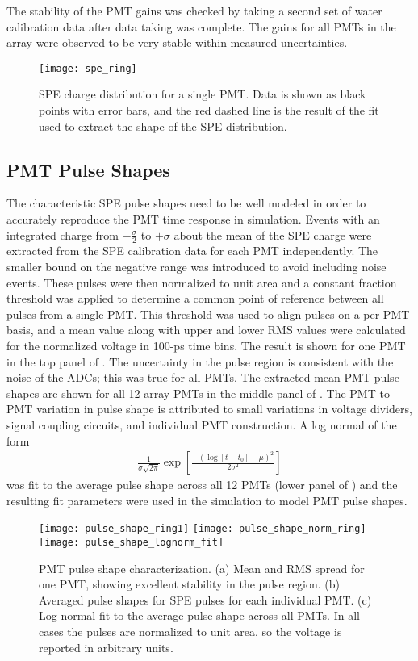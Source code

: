 The stability of the PMT gains was checked by taking a second set of water calibration data after data taking was complete.  
The gains for all PMTs in the array were observed to be very stable within measured uncertainties.

\begin{figure}
	\centering
	\texttt{[image: spe\_ring]}
	\caption{SPE charge distribution for a single PMT. Data is shown as black points with error bars, and the red dashed line is the result of the fit used to extract the shape of the SPE distribution. }
	\label{fig:spe_data}
\end{figure}


\subsection{PMT Pulse Shapes}
\label{sec:pmtpulses}
The characteristic SPE pulse shapes need to be well modeled in order to accurately reproduce the PMT time response in simulation. 
Events with an integrated charge from $-\frac{\sigma}{2}$ to $+\sigma$ about the mean of the SPE charge were extracted from the SPE calibration data for each PMT independently. 
The smaller bound on the negative range was introduced to avoid including noise events. 
These pulses were then normalized to unit area and a constant fraction threshold was applied to determine a common point of reference between all pulses from a single PMT.  
This threshold was used to align pulses on a per-PMT basis, and a mean value along with upper and lower RMS values were calculated for the normalized voltage in 100-ps time bins.
The result is shown for one PMT in the top panel of . 
The uncertainty in the pulse region is consistent with the noise of the ADCs; this was true for all PMTs. 
The extracted mean PMT pulse shapes are shown for all 12 array PMTs in the middle panel of . 
The PMT-to-PMT variation in pulse shape is attributed to small variations in voltage dividers, signal coupling circuits, and individual PMT construction. 
A log normal of the form 
\begin{eqnarray}
\frac{1}{\sigma \sqrt{2\pi}}\exp{\left[\frac{-\left(\log[t-t_0]-\mu\right)^2}{2\sigma^2}\right]}
\end{eqnarray}
was fit to the average pulse shape across all 12 PMTs (lower panel of ) and the resulting fit parameters were used in the simulation to model PMT pulse shapes.
	
\begin{figure}
	\centering
	\texttt{[image: pulse\_shape\_ring1]}
	\texttt{[image: pulse\_shape\_norm\_ring]}
	\texttt{[image: pulse\_shape\_lognorm\_fit]}
	\caption{PMT pulse shape characterization.   
	(a) Mean and RMS spread for one PMT, showing excellent stability in the pulse region.  
	(b) Averaged pulse shapes for SPE pulses for each individual PMT. 
	(c) Log-normal fit to the average pulse shape across all PMTs. 
	In all cases the pulses are normalized to unit area, so the voltage is reported in arbitrary units.}
	\label{fig:spe-pulse-shape}
\end{figure}


